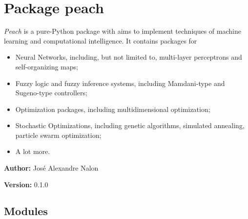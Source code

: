 %
%
%


\section{Package peach}

    \label{peach}

\emph{Peach} is a pure-Python package with aims to implement techniques of machine
learning and computational intelligence. It contains packages for
%
\begin{itemize}

\item Neural Networks, including, but not limited to, multi-layer perceptrons and
self-organizing maps;

\item Fuzzy logic and fuzzy inference systems, including Mamdani-type and
Sugeno-type controllers;

\item Optimization packages, including multidimensional optimization;

\item Stochastic Optimizations, including genetic algorithms, simulated annealing,
particle swarm optimization;

\item A lot more.

\end{itemize}
\textbf{Author:} 
José Alexandre Nalon


\textbf{Version:} 0.1.0





\subsection{Modules}

